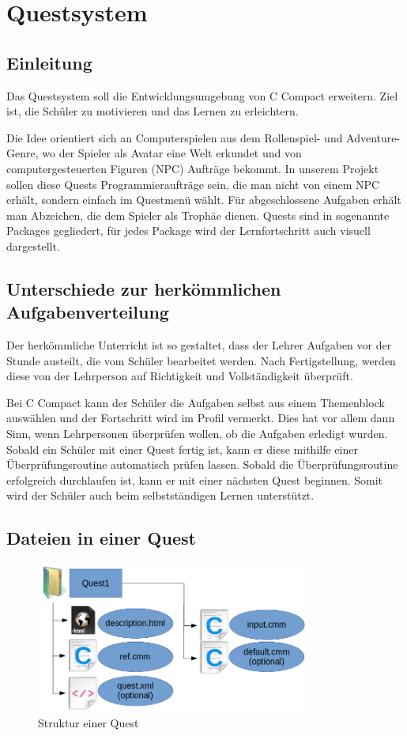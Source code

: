 \chapter{Questsystem}
\section{Einleitung}
Das Questsystem soll die Entwicklungsumgebung von C Compact  erweitern. Ziel ist, die Schüler zu motivieren und das Lernen zu erleichtern.

Die Idee orientiert sich an Computerspielen aus dem Rollenspiel- und Adventure-Genre, wo der Spieler als Avatar eine Welt erkundet und von computergesteuerten Figuren (NPC) Aufträge bekommt. In unserem Projekt sollen diese Quests Programmieraufträge sein, die man nicht von einem NPC erhält, sondern einfach im Questmenü wählt. Für abgeschlossene Aufgaben erhält man Abzeichen, die dem Spieler als Trophäe dienen. Quests sind in sogenannte Packages gegliedert, für jedes Package wird der Lernfortschritt auch visuell dargestellt.

\section{Unterschiede zur herkömmlichen Aufgabenverteilung}
Der herkömmliche Unterricht ist so gestaltet, dass der Lehrer Aufgaben vor der Stunde austeilt, die vom Schüler bearbeitet werden. Nach Fertigstellung, werden diese von der Lehrperson auf Richtigkeit und Vollständigkeit überprüft.

Bei C Compact kann der Schüler die Aufgaben selbst aus einem Themenblock auswählen und der Fortschritt wird im Profil vermerkt. Dies hat vor allem dann Sinn, wenn Lehrpersonen überprüfen wollen, ob die Aufgaben erledigt wurden. Sobald ein Schüler mit einer Quest fertig ist, kann er diese mithilfe einer Überprüfungsroutine automatisch prüfen lassen. Sobald die Überprüfungsroutine erfolgreich durchlaufen ist, kann er mit einer nächsten Quest beginnen. Somit wird der Schüler auch beim selbstständigen Lernen unterstützt.

\section{Dateien in einer Quest}
\label{sec:dateien_in_einer_quest}
\begin{figure}[h] 
  \centering
     \includegraphics[width=0.8\textwidth]{./media/images/quest/quest_ordnerstruktur}
  \caption{Struktur einer Quest}
  \label{fig:struct_quest}
\end{figure}

